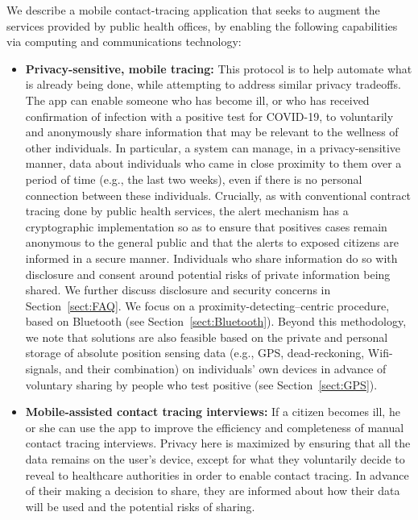 \documentclass{article}
\begin{document}
We describe a mobile contact-tracing application that seeks to augment the services provided by public health offices, by enabling the following capabilities via computing and communications technology:

\begin{itemize}
\item \textbf{Privacy-sensitive, mobile tracing:}  This protocol is to help automate what is already being done, while attempting to address similar privacy tradeoffs.
The app can enable someone who has become ill, or who has received confirmation of infection with a positive test for COVID-19, to voluntarily and anonymously share information that may be relevant to the wellness of other individuals.  In particular, a system can manage, in a privacy-sensitive manner, data about individuals who came in close proximity to them over a period of time (e.g., the last two weeks), even if there is no personal connection between these individuals.
Crucially, as with conventional contract tracing done by public health services, the alert mechanism has a cryptographic implementation so as to ensure that positives cases remain anonymous to the general public and that the alerts to exposed citizens are informed in a secure manner. Individuals who share information do so with disclosure and consent around potential risks of private information being shared. We further discuss disclosure and security concerns in Section~\ref{sect:FAQ}. We focus on a proximity-detecting--centric procedure, based on Bluetooth (see Section~\ref{sect:Bluetooth}). Beyond this methodology, we note that solutions are also feasible based on the private and personal storage of absolute position sensing data (e.g., GPS, dead-reckoning, Wifi-signals, and their combination) on individuals' own devices in advance of voluntary sharing by people who test positive (see Section~\ref{sect:GPS}).


\item \textbf{Mobile-assisted contact tracing interviews:}  If a citizen becomes ill, he or she can use the app to improve the efficiency and completeness of manual contact tracing interviews. Privacy here is maximized by ensuring that all the data remains on the user's device, except for what they voluntarily decide to reveal to healthcare authorities in order to enable contact tracing. In advance of their making a decision to share, they are informed about how their data will be used and the potential risks of sharing.


\end{itemize}
\end{document}
